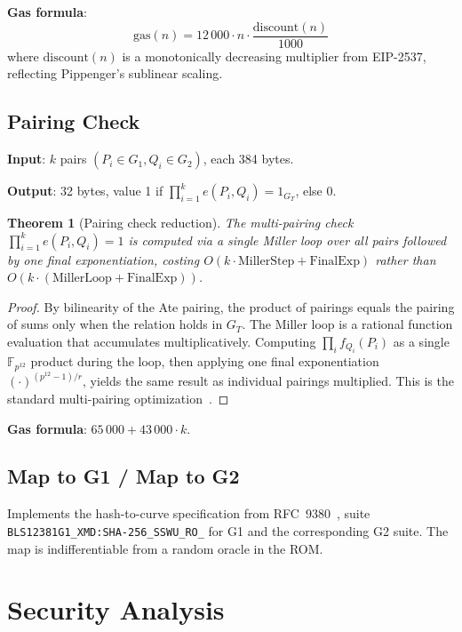 \documentclass[11pt,a4paper]{article}
\newtheorem{theorem}{Theorem}
\begin{document}
\textbf{Gas formula}:
\[
  \text{gas}(n) = 12\,000 \cdot n \cdot \frac{\text{discount}(n)}{1000}
\]
where $\text{discount}(n)$ is a monotonically decreasing multiplier from EIP-2537,
reflecting Pippenger's sublinear scaling.

\subsection{Pairing Check}

\textbf{Input}: $k$ pairs $(P_i \in G_1, Q_i \in G_2)$, each 384 bytes.

\textbf{Output}: 32 bytes, value 1 if $\prod_{i=1}^{k} e(P_i, Q_i) = 1_{G_T}$, else 0.

\begin{theorem}[Pairing check reduction]
The multi-pairing check $\prod_{i=1}^{k} e(P_i, Q_i) = 1$ is computed via a single
Miller loop over all pairs followed by one final exponentiation, costing
$O(k \cdot \text{MillerStep} + \text{FinalExp})$ rather than
$O(k \cdot (\text{MillerLoop} + \text{FinalExp}))$.
\end{theorem}

\begin{proof}
By bilinearity of the Ate pairing, the product of pairings equals the pairing of sums
only when the relation holds in $G_T$. The Miller loop is a rational function evaluation
that accumulates multiplicatively. Computing $\prod_i f_{Q_i}(P_i)$ as a single
$\mathbb{F}_{p^{12}}$ product during the loop, then applying one final exponentiation
$(\cdot)^{(p^{12}-1)/r}$, yields the same result as individual pairings multiplied.
This is the standard multi-pairing optimization~\cite{scott-multipairing}.
\end{proof}

\textbf{Gas formula}: $65\,000 + 43\,000 \cdot k$.

\subsection{Map to G1 / Map to G2}

Implements the hash-to-curve specification from RFC~9380~\cite{rfc9380},
suite \texttt{BLS12381G1\_XMD:SHA-256\_SSWU\_RO\_} for G1 and the corresponding
G2 suite. The map is indifferentiable from a random oracle in the ROM.

\section{Security Analysis}
\end{document}

